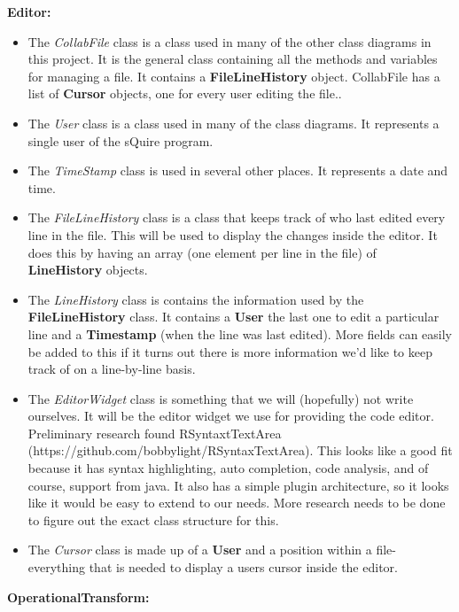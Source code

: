 \documentclass[twoside,letterpaper]{article}
\begin{document}
{\textbf{Editor:}\\
\begin{itemize}
\item The \textit{CollabFile} class is a class used in many of the other class diagrams in this project. It is the general class containing all the methods and variables for managing a file. It contains a \textbf{FileLineHistory} object. CollabFile has a list of \textbf{Cursor} objects, one for every user editing the file..
  \item The \textit{User} class is a class used in many of the class diagrams. It represents a single user of the sQuire program.
  \item The \textit{TimeStamp} class is used in several other places. It represents a date and time.
	\item The \textit{FileLineHistory} class is a class that keeps track of who last edited every line in the file. This will be used to display the changes inside the editor. It does this by having an array (one element per line in the file) of \textbf{LineHistory} objects.
  \item The \textit{LineHistory} class is contains the information used by the \textbf{FileLineHistory} class. It contains a \textbf{User} {the last one to edit a particular line} and a \textbf{Timestamp} (when the line was last edited). More fields can easily be added to this if it turns out there is more information we'd like to keep track of on a line-by-line basis.
	\item The \textit{EditorWidget} class is something that we will (hopefully) not write ourselves. It will be the editor widget we use for providing the code editor. Preliminary research found RSyntaxtTextArea (https://github.com/bobbylight/RSyntaxTextArea). This looks like a good fit because it has syntax highlighting, auto completion, code analysis, and of course, support from java. It also has a simple plugin architecture, so it looks like it would be easy to extend to our needs. More research needs to be done to figure out the exact class structure for this.
  \item The \textit{Cursor} class is made up of a \textbf{User} and a position within a file- everything that is needed to display a users cursor inside the editor.
\end{itemize}

\textbf{OperationalTransform:}


}
\end{document}
